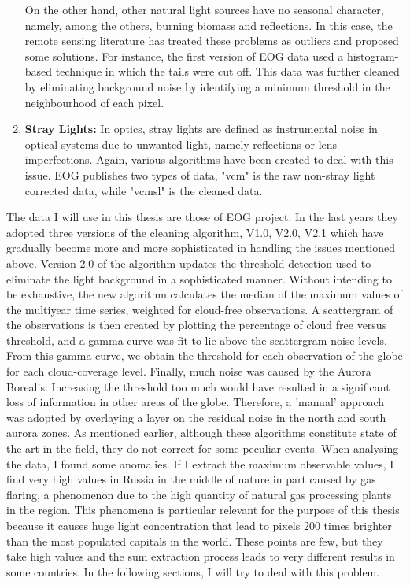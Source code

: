 \begin{enumerate}
On the other hand, other natural light sources have no seasonal character, namely, among the others, burning biomass and reflections. In this case, the remote sensing literature has treated these problems as outliers and proposed some solutions. For instance, the first version of EOG data used a histogram-based technique in which the tails were cut off. This data was further cleaned by eliminating background noise by identifying a minimum threshold in the neighbourhood of each pixel.
\item \textbf{Stray Lights:} In optics, stray lights are defined as instrumental noise in optical systems due to unwanted light, namely reflections or lens imperfections. Again, various algorithms have been created to deal with this issue. EOG publishes two types of data, "vcm" is the raw non-stray light corrected data, while "vcmsl" is the cleaned data.
\end{enumerate}
The data I will use in this thesis are those of EOG project. In the last years they adopted three versions of the cleaning algorithm, V1.0, V2.0, V2.1 which have gradually become more and more sophisticated in handling the issues mentioned above.
Version 2.0 of the algorithm updates the threshold detection used to eliminate the light background in a sophisticated manner. Without intending to be exhaustive, the new algorithm calculates the median of the maximum values of the multiyear time series, weighted for cloud-free observations. A scattergram of the observations is then created by plotting the percentage of cloud free versus threshold, and a gamma curve was fit to lie above the scattergram noise levels. From this gamma curve, we obtain the threshold for each observation of the globe for each cloud-coverage level.
Finally, much noise was caused by the Aurora Borealis. Increasing the threshold too much would have resulted in a significant loss of information in other areas of the globe. Therefore, a 'manual' approach was adopted by overlaying a layer on the residual noise in the north and south aurora zones.
As mentioned earlier, although these algorithms \citep{elvidge2021annual} constitute state of the art in the field, they do not correct for some peculiar events. When analysing the data, I found some anomalies. If I extract the maximum observable values, I find very high values in Russia in the middle of nature in part caused by gas flaring, a phenomenon due to the high quantity of natural gas processing plants in the region.
This phenomena is particular relevant for the purpose of this thesis because it causes huge light concentration that lead to pixels 200 times brighter than the most populated capitals in the world. 
These points are few, but they take high values and the sum extraction process leads to very different results in some countries. In the following sections, I will try to deal with this problem.
